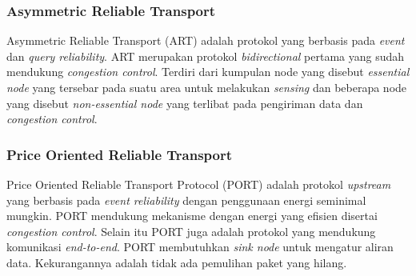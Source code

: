 \subsubsection{Asymmetric Reliable Transport \cite{art}}
Asymmetric Reliable Transport (ART) adalah protokol yang berbasis pada \textit{event} dan \textit{query reliability}. ART merupakan protokol \textit{bidirectional} pertama yang sudah mendukung \textit{congestion control}. Terdiri dari kumpulan node yang disebut \textit{essential node} yang tersebar pada suatu area untuk melakukan \textit{sensing} dan beberapa node yang disebut \textit{non-essential node} yang terlibat pada pengiriman data dan \textit{congestion control}.

\subsubsection{Price Oriented Reliable Transport \cite{port}}
Price Oriented Reliable Transport Protocol (PORT) adalah protokol \textit{upstream} yang berbasis pada \textit{event reliability} dengan penggunaan energi seminimal mungkin. PORT mendukung mekanisme dengan energi yang efisien disertai \textit{congestion control}. Selain itu PORT juga adalah protokol yang mendukung komunikasi \textit{end-to-end}. PORT membutuhkan \textit{sink node} untuk mengatur aliran data. Kekurangannya adalah tidak ada pemulihan paket yang hilang.

